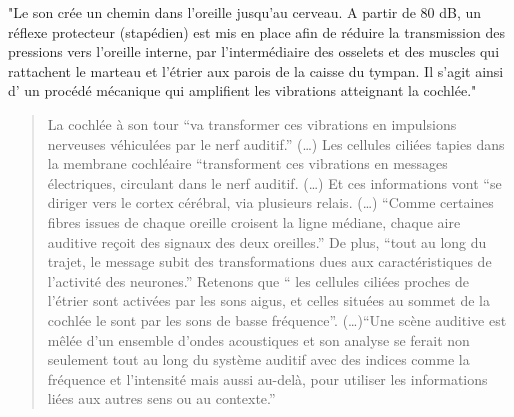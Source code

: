 "Le  son crée un chemin dans
l'oreille \autocite[322--324]{marieb:biologie} jusqu'au cerveau.
A partir de 80 dB, un réflexe protecteur (stapédien) est mis en place
afin de réduire la transmission des pressions vers l\textquoteright oreille
interne, par l\textquoteright intermédiaire des osselets et des muscles
qui rattachent le marteau et l\textquoteright étrier aux parois de
la caisse du tympan. Il s'agit ainsi d' un procédé mécanique qui amplifient
les vibrations atteignant la cochlée."
\begin{quotation}
	La cochlée à son tour ``va transformer ces vibrations en impulsions
	nerveuses véhiculées par le nerf auditif.'' (\dots) Les cellules ciliées
	tapies dans la membrane cochléaire ``transforment ces vibrations
	en messages électriques, circulant dans le nerf auditif. (\dots) Et
	ces informations vont ``se diriger vers le cortex cérébral, via plusieurs
	relais. (\dots) ``Comme certaines fibres issues de chaque oreille croisent
	la ligne médiane, chaque aire auditive reçoit des signaux des deux
	oreilles.'' De plus, ``tout au long du trajet, le message subit
	des transformations dues aux caractéristiques de l'activité des neurones.''
	Retenons que `` les cellules ciliées proches de l'étrier sont activées
	par les sons aigus, et celles situées au sommet de la cochlée le sont
	par les sons de basse fréquence''. (\dots)``Une scène auditive est
	mêlée d'un ensemble d'ondes acoustiques et son analyse se ferait non
	seulement tout au long du système auditif avec des indices comme la
	fréquence et l'intensité mais aussi au-delà, pour utiliser les informations
	liées aux autres sens ou au contexte.'' \autocite[~15--16]{bigand:cerveau}
\end{quotation}


